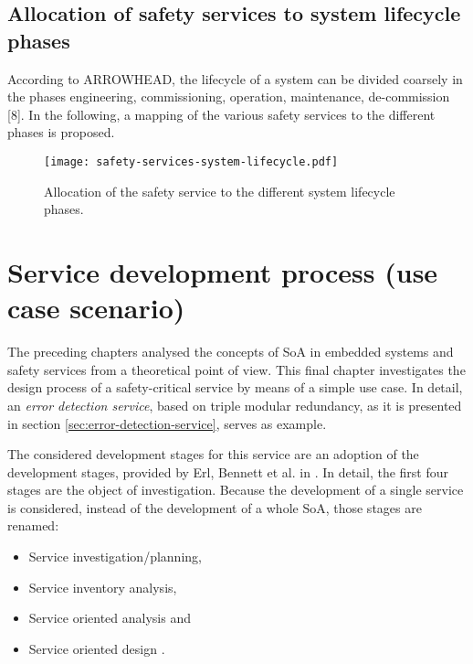 \subsection{Allocation of safety services to system lifecycle phases}

According to ARROWHEAD, the lifecycle of a system can be divided coarsely in the phases engineering, commissioning, operation, maintenance, de-commission [8]. In the following, a mapping of the various safety services to the different phases is proposed.

\begin{figure}[ht]
\centering
\label{fig:safety-services-system-lifecycle}
\caption{Allocation of the safety service to the different system lifecycle phases.}
\texttt{[image: safety-services-system-lifecycle.pdf]}
\end{figure}







\section{Service development process (use case scenario)}
\label{sec:service-development-process}

The preceding chapters analysed the concepts of SoA in embedded systems and safety services from a theoretical point of view. This final chapter investigates the design process of a safety-critical service by means of a simple use case. In detail, an \emph{error detection service}, based on triple modular redundancy, as it is presented in section \ref{sec:error-detection-service}, serves as example.

The considered development stages for this service are an adoption of the development stages, provided by Erl, Bennett et al. in \cite[p.116]{erl2011}. In detail, the first four stages are the object of investigation. Because the development of a single service is considered, instead of the development of a whole SoA, those stages are renamed:
\begin{itemize}
\item Service investigation/planning,
\item Service inventory analysis,
\item Service oriented analysis and
\item Service oriented design \cite[p.116]{erl2011}.
\end{itemize}

